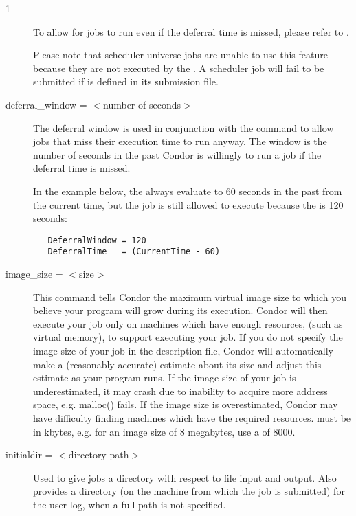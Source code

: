 \begin{ManPage}{\label{man-condor-submit}}{1}
\begin{description}
To allow for jobs to run even if the deferral time is missed,
please refer to .

Please note that scheduler universe jobs are unable to use this
feature because they are not executed by the .
A scheduler job will fail to be submitted if 
is defined in its submission file.


\item[deferral\_window = $<$number-of-seconds$>$]
The deferral window is used in conjunction with the
 command to allow jobs that
miss their execution time to run anyway. The window is
the number of seconds in the past Condor is willingly
to run a job if the deferral time is missed.

In the example below, the  always
evaluate to 60 seconds in the past from the current time, but
the job is still allowed to execute because the 
 is 120 seconds:

\begin{verbatim} 
   DeferralWindow = 120
   DeferralTime   = (CurrentTime - 60)
\end{verbatim}



\item[image\_size = $<$size$>$] This command tells Condor the maximum
virtual image size to which you believe your program will grow during
its execution. Condor will then execute your job only on machines which
have enough resources, (such as virtual memory), to support executing
your job. If you do not specify the image size of your job in the
description file, Condor will automatically make a (reasonably accurate)
estimate about its size and adjust this estimate as your program runs.
If the image size of your job is underestimated, it may crash due to
inability to acquire more address space, e.g. malloc() fails. If the image
size is overestimated, Condor may have difficulty finding machines which
have the required resources.  must be in kbytes, e.g. for
an image size of 8 megabytes, use a  of 8000.


\item[initialdir = $<$directory-path$>$] 
Used to give jobs a directory with respect to file input and output.
Also provides a directory 
(on the machine from which the job is submitted)
for the user log, when a full path is not specified. 


\end{description}
\end{ManPage}
